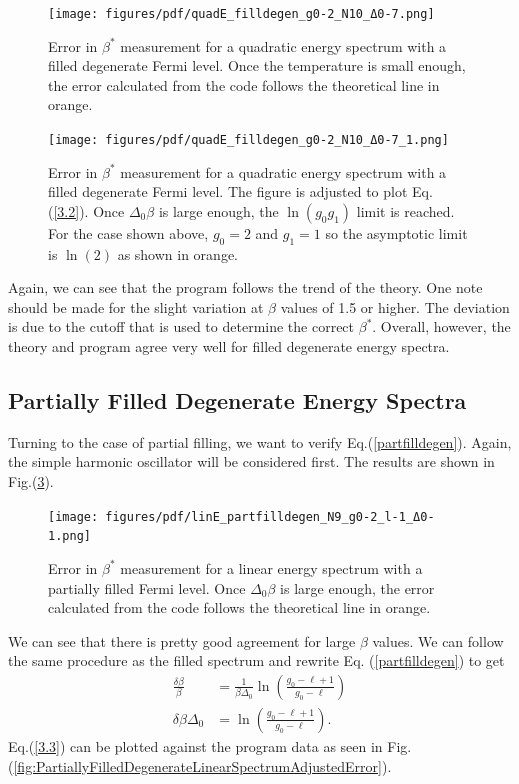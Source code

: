 \begin{figure}[H]
    \centering
    \texttt{[image: figures/pdf/quadE\_filldegen\_g0-2\_N10\_Δ0-7.png]}
    \caption{Error in $\beta^*$ measurement for a quadratic energy spectrum with a filled
degenerate Fermi level. Once the temperature is small enough, the error calculated from the code
follows the theoretical line in orange.}
    \label{fig:FilledDegenerate}
\end{figure}

\begin{figure}[H]
    \centering
    \texttt{[image: figures/pdf/quadE\_filldegen\_g0-2\_N10\_Δ0-7\_1.png]}
    \caption{Error in $\beta^*$ measurement for a quadratic energy spectrum with a filled
degenerate Fermi level. The figure is adjusted to plot Eq.\@ (\ref{3.2}). Once $\Delta_0\beta$ is large enough, the $\ln(g_0g_1)$ limit is reached. For the case shown above, $g_0=2$ and $g_1=1$ so the asymptotic limit is $\ln(2)$ as shown in orange.}
    \label{fig:FilledDegenerate2}
\end{figure}
Again, we can see that the program follows the trend of the theory. One note should be made for the slight variation at $\beta$ values of 1.5 or higher. The deviation is due to the cutoff that is used to determine the correct $\beta^*$. Overall, however, the theory and program agree very well for filled degenerate energy spectra.

\subsection{Partially Filled Degenerate Energy Spectra}
Turning to the case of partial filling, we want to verify Eq.\@ (\ref{partfilldegen}). Again, the simple harmonic oscillator will be considered first. The results are shown in Fig.\@ (\ref{fig:PartiallyFilledDegenerateLinearSpectrum}). 

\begin{figure}[H]
    \centering
    \texttt{[image: figures/pdf/linE\_partfilldegen\_N9\_g0-2\_l-1\_Δ0-1.png]}
    \caption{Error in $\beta^*$ measurement for a linear energy spectrum with a partially filled Fermi level. Once $\Delta_0\beta$ is large enough, the error calculated from the code follows the theoretical line in orange.}
    \label{fig:PartiallyFilledDegenerateLinearSpectrum}
\end{figure}

We can see that there is pretty good agreement for large $\beta$ values. We can follow the same procedure as the filled spectrum and rewrite Eq. (\ref{partfilldegen}) to get
\begin{align}
    \frac{\delta\beta}{\beta}&=\frac{1}{\beta\Delta_0}\ln(\frac{g_0-\ell+1}{g_0-\ell})\nonumber\\
    \delta\beta \Delta_0&=\ln(\frac{g_0-\ell+1}{g_0-\ell}). \label{3.3}
\end{align}
Eq.\@ (\ref{3.3}) can be plotted against the program data as seen in Fig. (\ref{fig:PartiallyFilledDegenerateLinearSpectrumAdjustedError}). 

